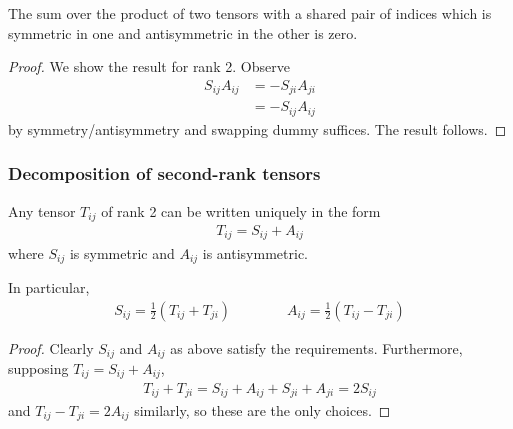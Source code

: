 \documentclass{../template/note}
\begin{document}
    \begin{proposition*}
        The sum over the product of two tensors with a shared pair of indices which is symmetric in one and antisymmetric in the other is zero.
    \end{proposition*}
    
    \begin{proof}
        We show the result for rank 2. Observe
        \begin{align*}
            S_{ij}A_{ij} &= -S_{ji}A_{ji} \\
            &= -S_{ij}A_{ij}
        \end{align*}
        by symmetry/antisymmetry and swapping dummy suffices. The result follows.        
    \end{proof}
    
    \subsubsection{Decomposition of second-rank tensors}

    \begin{proposition}
        Any tensor \(T_{ij}\) of rank 2 can be written uniquely in the form
        \begin{align*}
            T_{ij} = S_{ij} + A_{ij}
        \end{align*}
        where \(S_{ij}\) is symmetric and \(A_{ij}\) is antisymmetric.
    \end{proposition}
    
    \begin{proposition}
        In particular,
        \begin{align*}
            S_{ij} = \frac 1 2\left(T_{ij} + T_{ji}\right) \qquad \qquad A_{ij} = \frac 1 2\left(T_{ij} - T_{ji}\right)
        \end{align*}
    \end{proposition}
    
    \begin{proof}
        Clearly \(S_{ij}\) and \(A_{ij}\) as above satisfy the requirements. Furthermore, supposing \(T_{ij} = S_{ij} + A_{ij}\), 
        \begin{align*}
            T_{ij} + T_{ji} = S_{ij} + A_{ij} + S_{ji} + A_{ji} = 2S_{ij}
        \end{align*}
        and \(T_{ij} - T_{ji} = 2A_{ij}\) similarly, so these are the only choices.        
    \end{proof}
    
\end{document}
